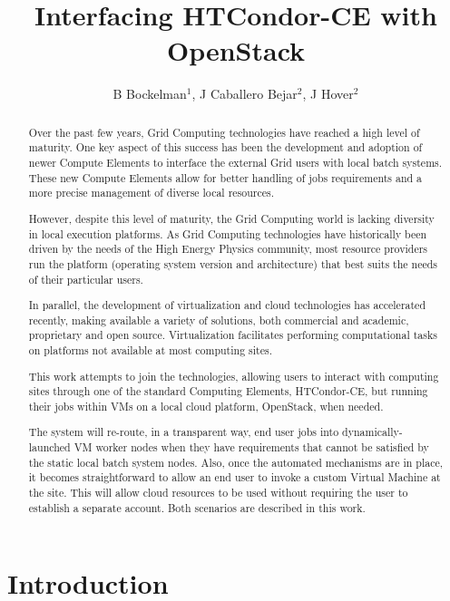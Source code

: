 \documentclass[a4paper]{jpconf}
\begin{document}
\title{Interfacing HTCondor-CE with OpenStack}

\author{B Bockelman$^1$, J Caballero Bejar$^2$, J Hover$^2$}

\address{$^1$ University of Nebraska-Lincoln, Lincoln, NE 68588, USA}
\address{$^2$ Brookhaven National Laboratory, PO BOX 5000 Upton, NY 11973, USA}


\begin{abstract}
Over the past few years, Grid Computing technologies have reached a high level of maturity. 
One key aspect of this success has been the development and adoption of newer Compute Elements to interface the external Grid users with local batch systems. 
These new Compute Elements allow for better handling of jobs requirements and a more precise management of diverse local resources.

However, despite this level of maturity, the Grid Computing world is lacking diversity in local execution platforms. 
As Grid Computing technologies have historically been driven by the needs of the High Energy Physics community, 
most resource providers run the platform (operating system version and architecture) that best suits the needs of their particular users.

In parallel, the development of virtualization and cloud technologies has accelerated recently, 
making available a variety of solutions, both commercial and academic, proprietary and open source. 
Virtualization facilitates performing computational tasks on platforms not available at most computing sites.

This work attempts to join the technologies, allowing users to interact with computing sites through one of the standard Computing Elements, HTCondor-CE,
but running their jobs within VMs on a local cloud platform, OpenStack, when needed.

The system will re-route, in a transparent way, 
end user jobs into dynamically-launched VM worker nodes when they have requirements that cannot be satisfied by the static local batch system nodes. 
Also, once the automated mechanisms are in place, it becomes straightforward to allow an end user to invoke a custom Virtual Machine at the site. 
This will allow cloud resources to be used without requiring the user to establish a separate account. Both scenarios are described in this work.
\end{abstract}

\section{Introduction}
\end{document}
